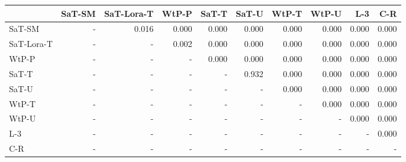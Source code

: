 \begin{tabular}{lrrrrrrrrr}
\toprule
 & SaT-SM & SaT-Lora-T & WtP-P & SaT-T & SaT-U & WtP-T & WtP-U & L-3 & C-R \\
\midrule
SaT-SM & - & 0.016 & 0.000 & 0.000 & 0.000 & 0.000 & 0.000 & 0.000 & 0.000 \\
SaT-Lora-T & - & - & 0.002 & 0.000 & 0.000 & 0.000 & 0.000 & 0.000 & 0.000 \\
WtP-P & - & - & - & 0.000 & 0.000 & 0.000 & 0.000 & 0.000 & 0.000 \\
SaT-T & - & - & - & - & 0.932 & 0.000 & 0.000 & 0.000 & 0.000 \\
SaT-U & - & - & - & - & - & 0.000 & 0.000 & 0.000 & 0.000 \\
WtP-T & - & - & - & - & - & - & 0.000 & 0.000 & 0.000 \\
WtP-U & - & - & - & - & - & - & - & 0.000 & 0.000 \\
L-3 & - & - & - & - & - & - & - & - & 0.000 \\
C-R & - & - & - & - & - & - & - & - & - \\
\bottomrule
\end{tabular}

